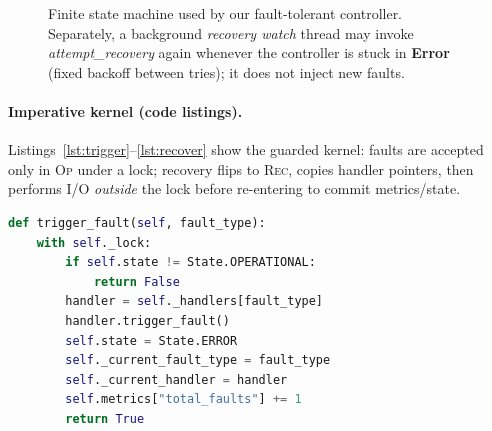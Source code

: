 \documentclass[sigconf,authorversion,nonacm]{acmart}
\begin{document}
\begin{figure}[!ht]
  \centering
  \caption{Finite state machine used by our fault-tolerant controller. Separately, a background \emph{recovery watch} thread may invoke \emph{attempt\_recovery} again whenever the controller is stuck in \textbf{Error} (fixed backoff between tries); it does not inject new faults.}
  \label{fig:fsm}
\end{figure}

\paragraph{Imperative kernel (code listings).}
Listings~\ref{lst:trigger}--\ref{lst:recover} show the guarded kernel: faults are accepted only in \textsc{Op} under a lock; recovery flips to \textsc{Rec}, copies handler pointers, then performs I/O \emph{outside} the lock before re-entering to commit metrics/state.

\begin{lstlisting}[language=Python, basicstyle=\ttfamily\scriptsize, caption={\emph{trigger\_fault} (excerpt).}, label={lst:trigger}]
def trigger_fault(self, fault_type):
    with self._lock:
        if self.state != State.OPERATIONAL:
            return False
        handler = self._handlers[fault_type]
        handler.trigger_fault()
        self.state = State.ERROR
        self._current_fault_type = fault_type
        self._current_handler = handler
        self.metrics["total_faults"] += 1
        return True
\end{lstlisting}
\end{document}
